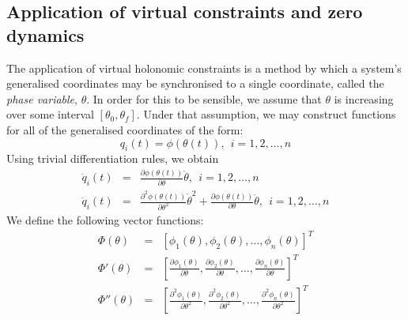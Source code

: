 \subsection{Application of virtual constraints and zero dynamics}
The application of virtual holonomic constraints is a method by which a system's generalised coordinates may be synchronised to a single coordinate, called the \textit{phase variable}, $\theta$. In order for this to be sensible, we assume that $\theta$ is increasing over some interval $[\theta_0, \theta_f]$. Under that assumption, we may construct functions for all of the generalised coordinates of the form:
\begin{equation}
	q_i(t) = \phi\left(\theta(t)\right), ~~ i = 1,2,\ldots,n
\end{equation}
Using trivial differentiation rules, we obtain
\begin{eqnarray}
	\dot{q}_i(t) &=& \frac{\partial\phi\left(\theta(t)\right)}{\partial\theta}\dot{\theta},
						~~i = 1,2,\ldots,n \\
	\ddot{q}_i(t) &=& \frac{\partial^2\phi\left(\theta(t)\right)}{\partial\theta^2}\dot{\theta}^2 +
						\frac{\partial\phi\left(\theta(t)\right)}{\partial\theta}\ddot{\theta},
						~~i = 1,2,\ldots,n
\end{eqnarray}
We define the following vector functions:
\begin{eqnarray}
	\Phi\left(\theta\right) &=& \left[ \phi_1\left(\theta\right), \phi_2\left(\theta\right), \ldots,
	\phi_n\left(\theta\right)\right]^T \\
	\Phi'\left(\theta\right) &=& \left[ \frac{\partial\phi_1\left(\theta\right)}{\partial\theta},
	\frac{\partial\phi_2\left(\theta\right)}{\partial\theta}, \ldots ,
	\frac{\partial\phi_n\left(\theta\right)}{\partial\theta} \right]^T \\
	\Phi''\left(\theta\right) &=& \left[ \frac{\partial^2\phi_1\left(\theta\right)}{\partial\theta^2},
	\frac{\partial^2\phi_2\left(\theta\right)}{\partial\theta^2}, \ldots ,
	\frac{\partial^2\phi_n\left(\theta\right)}{\partial\theta^2} \right]^T
\end{eqnarray} ~\\

